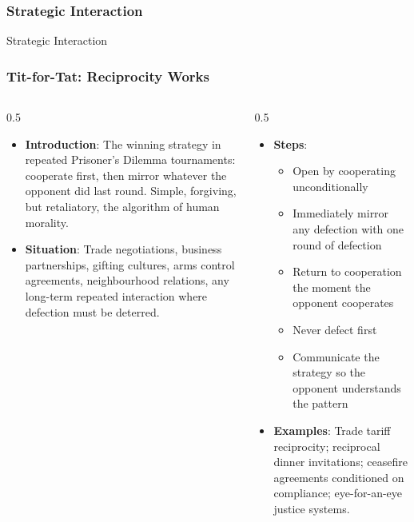 \begin{frame}[fragile]\frametitle{Strategic Interaction}
\begin{center}
{\Large Strategic Interaction}
\end{center}
\end{frame}

\begin{frame}[fragile]\frametitle{Tit-for-Tat: Reciprocity Works}
\begin{columns}
    \begin{column}[T]{0.5\linewidth}
      \begin{itemize}
        \item \textbf{Introduction}: The winning strategy in repeated Prisoner's Dilemma tournaments: cooperate first, then mirror whatever the opponent did last round. Simple, forgiving, but retaliatory, the algorithm of human morality.
        \item \textbf{Situation}: Trade negotiations, business partnerships, gifting cultures, arms control agreements, neighbourhood relations, any long-term repeated interaction where defection must be deterred.
      \end{itemize}
    \end{column}
    \begin{column}[T]{0.5\linewidth}
      \begin{itemize}
        \item \textbf{Steps}:
        \begin{itemize}
          \item Open by cooperating unconditionally
          \item Immediately mirror any defection with one round of defection
          \item Return to cooperation the moment the opponent cooperates
          \item Never defect first
          \item Communicate the strategy so the opponent understands the pattern
        \end{itemize}\item \textbf{Examples}: Trade tariff reciprocity; reciprocal dinner invitations; ceasefire agreements conditioned on compliance; eye-for-an-eye justice systems.
      \end{itemize}
    \end{column}
  \end{columns}
\end{frame}


